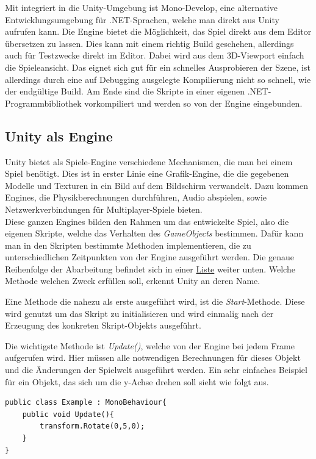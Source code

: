 Mit integriert in die Unity-Umgebung ist Mono-Develop, eine alternative Entwicklungsumgebung für .NET-Sprachen, welche man direkt aus Unity aufrufen kann. Die Engine bietet die Möglichkeit, das Spiel direkt aus dem Editor übersetzen zu lassen. Dies kann mit einem richtig Build geschehen, allerdings auch für Testzwecke direkt im Editor. Dabei wird aus dem 3D-Viewport einfach die Spieleansicht. Das eignet sich gut für ein schnelles Ausprobieren der Szene, ist allerdings durch eine auf Debugging ausgelegte Kompilierung nicht so schnell, wie der endgültige Build. Am Ende sind die Skripte in einer eigenen .NET-Programmbibliothek vorkompiliert und werden so von der Engine eingebunden.

\subsection{Unity als Engine}

Unity bietet als Spiele-Engine verschiedene Mechanismen, die man bei einem Spiel benötigt. Dies ist in erster Linie eine Grafik-Engine, die die gegebenen Modelle und Texturen in ein Bild auf dem Bildschirm verwandelt. Dazu kommen Engines, die Physikberechnungen durchführen, Audio abspielen, sowie Netzwerkverbindungen für Multiplayer-Spiele bieten.\\
Diese ganzen Engines bilden den Rahmen um das entwickelte Spiel, also die eigenen Skripte, welche das Verhalten des \textit{GameObjects} bestimmen. Dafür kann man in den Skripten bestimmte Methoden implementieren, die zu unterschiedlichen Zeitpunkten von der Engine ausgeführt werden. Die genaue Reihenfolge der Abarbeitung befindet sich in einer \hyperlink{MainLoopOrder}{Liste} weiter unten. Welche Methode welchen Zweck erfüllen soll, erkennt Unity an deren Name. 

Eine Methode die nahezu als erste ausgeführt wird, ist die \textit{Start}-Methode. Diese wird genutzt um das Skript zu initialisieren und wird einmalig nach der Erzeugung des konkreten Skript-Objekts ausgeführt.

Die wichtigste Methode ist \textit{Update()}, welche von der Engine bei jedem Frame aufgerufen wird. Hier müssen alle notwendigen Berechnungen für dieses Objekt und die Änderungen der Spielwelt ausgeführt werden.
Ein sehr einfaches Beispiel für ein Objekt, das sich um die y-Achse drehen soll sieht wie folgt aus.\\

\begin{lstlisting}[caption={[Einfache Skript-Klasse mit Update-Methode]Einfache Skript-Klasse mit Update-Methode}]
public class Example : MonoBehaviour{
	public void Update(){
		transform.Rotate(0,5,0);
	}
}
\end{lstlisting}

